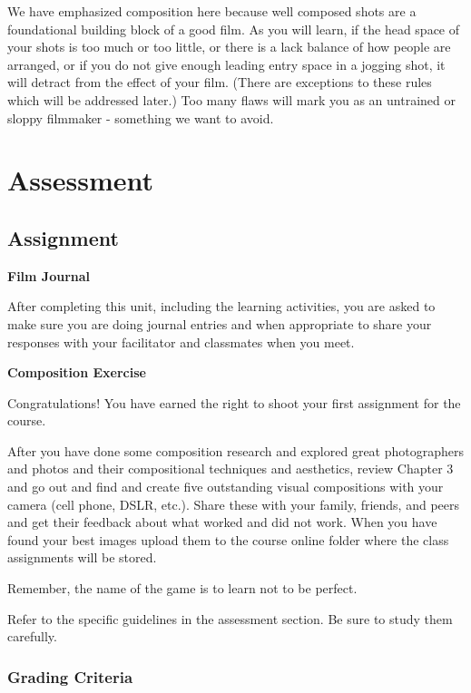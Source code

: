 \documentclass[
]{book}
\begin{document}
We have emphasized composition here because well composed shots are a foundational building block of a good film. As you will learn, if the head space of your shots is too much or too little, or there is a lack balance of how people are arranged, or if you do not give enough leading entry space in a jogging shot, it will detract from the effect of your film. (There are exceptions to these rules which will be addressed later.) Too many flaws will mark you as an untrained or sloppy filmmaker - something we want to avoid.

\hypertarget{assessment-3}{%
\section*{Assessment}\label{assessment-3}}

\hypertarget{assignment}{%
\subsection*{Assignment}\label{assignment}}

\textbf{Film Journal}

After completing this unit, including the learning activities, you are asked to make sure you are doing journal entries and when appropriate to share your responses with your facilitator and classmates when you meet.

\textbf{Composition Exercise}

Congratulations! You have earned the right to shoot your first assignment for the course.

After you have done some composition research and explored great photographers and photos and their compositional techniques and aesthetics, review Chapter 3 and go out and find and create five outstanding visual compositions with your camera (cell phone, DSLR, etc.). Share these with your family, friends, and peers and get their feedback about what worked and did not work. When you have found your best images upload them to the course online folder where the class assignments will be stored.

Remember, the name of the game is to learn not to be perfect.

Refer to the specific guidelines in the assessment section. Be sure to study them carefully.

\hypertarget{grading-criteria-2}{%
\subsubsection*{Grading Criteria}\label{grading-criteria-2}}
\end{document}
